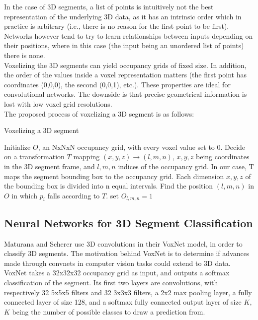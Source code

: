 In the case of 3D segments, a list of points is intuitively not the best representation of the underlying 3D data, as it has an intrinsic order which in practice is arbitrary (i.e., there is no reason for the first point to be first). Networks however tend to try to learn relationships between inputs depending on their positions, where in this case (the input being an unordered list of points) there is none.\\

Voxelizing the 3D segments can yield occupancy grids of fixed size. In addition, the order of the values inside a voxel representation matters (the first point has coordinates (0,0,0), the second (0,0,1), etc.). These properties are ideal for convolutional networks. The downside is that precise geometrical information is lost with low voxel grid resolutions.\\

The proposed process of voxelizing a 3D segment is as follows:

\begin{algorithm}
  \caption{Voxelizing a 3D segment}
  \begin{algorithmic}[1]
    \State Initialize $O$, an NxNxN occupancy grid, with every voxel value set to 0.
    \State Decide on a transformation $T$ mapping $(x,y,z) \to (l,m,n)$, $x,y,z$ being coordinates in the 3D segment frame, and $l,m,n$ indices of the occupancy grid. In our case, T maps the segment bounding box to the occupancy grid. Each dimension $x,y,z$ of the bounding box is divided into n equal intervals.
    \State Find the position $(l,m,n)$ in $O$ in which $p_i$ falls according to $T$.
     \State set $O_{l,m,n} = 1$
    \EndIf
    \EndFor
  \end{algorithmic}
\end{algorithm}

\subsection{Neural Networks for 3D Segment Classification}
\label{subsec:voxnet}

Maturana and Scherer \cite{voxnet} use 3D convolutions in their VoxNet model, in order to classify 3D segments. The motivation behind VoxNet is to determine if advances made through convnets in computer vision tasks could extend to 3D data.\\

VoxNet takes a 32x32x32 occupancy grid as input, and outputs a softmax classification of the segment.  
Its first two layers are convolutions, with respectively 32 5x5x5 filters and 32 3x3x3 filters, a 2x2 max pooling layer, a fully connected layer of size 128, and a softmax fully connected output layer of size $K$, $K$ being the number of possible classes to draw a prediction from.\\

